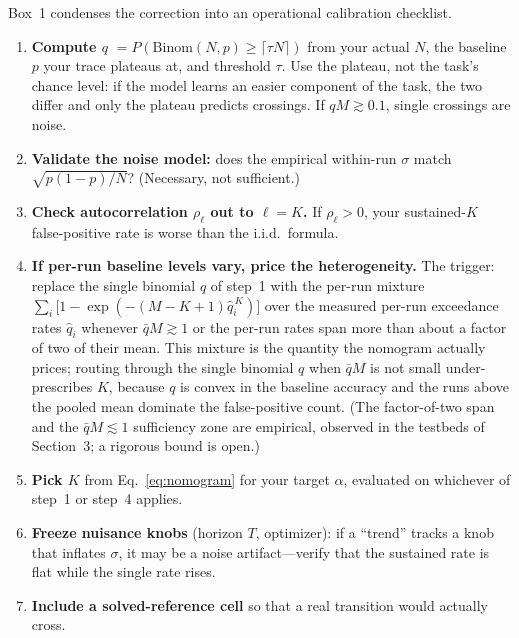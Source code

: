 \documentclass[11pt]{article}
\theoremstyle{plain}
\theoremstyle{definition}
\begin{document}
Box~1 condenses the correction into an operational calibration checklist.

\begin{tcolorbox}[colback=gray!6, colframe=gray!40, arc=2pt,
  left=6pt, right=6pt, top=4pt, bottom=4pt,
  title={\small\bfseries Box 1. Calibration checklist: before declaring emergence from a threshold crossing},
  fonttitle=\small\bfseries, breakable, enhanced]
\begin{enumerate}
\item \textbf{Compute $q$} $=P(\mathrm{Binom}(N,p)\geq\lceil\tau N\rceil)$ from your actual
  $N$, the baseline $p$ your trace plateaus at, and threshold $\tau$. Use the plateau, not
  the task's chance level: if the model learns an easier component of the task, the two
  differ and only the plateau predicts crossings. If $qM\gtrsim0.1$, single crossings are
  noise.
\item \textbf{Validate the noise model:} does the empirical within-run $\sigma$ match
  $\sqrt{p(1-p)/N}$? (Necessary, not sufficient.)
\item \textbf{Check autocorrelation $\rho_\ell$ out to $\ell=K$.} If $\rho_\ell>0$, your
  sustained-$K$ false-positive rate is worse than the i.i.d.\ formula.
\item \textbf{If per-run baseline levels vary, price the heterogeneity.} The trigger:
  replace the single binomial $q$ of step~1 with the per-run mixture
  $\sum_i\bigl[1-\exp(-(M-K+1)\hat q_i^{\,K})\bigr]$ over the measured per-run exceedance
  rates $\hat q_i$ whenever $\bar qM \gtrsim 1$ or the per-run rates span more than
  about a factor of two of their mean. This mixture is the quantity the nomogram
  actually prices; routing through the single binomial $q$ when $\bar qM$ is not
  small under-prescribes $K$, because $q$ is convex in the baseline accuracy and the
  runs above the pooled mean dominate the false-positive count. (The factor-of-two
  span and the $\bar qM \lesssim 1$ sufficiency zone are empirical, observed in the
  testbeds of Section~3; a rigorous bound is open.)
\item \textbf{Pick $K$} from Eq.~\eqref{eq:nomogram} for your target $\alpha$, evaluated on
  whichever of step~1 or step~4 applies.
\item \textbf{Freeze nuisance knobs} (horizon $T$, optimizer): if a ``trend'' tracks a knob
  that inflates $\sigma$, it may be a noise artifact---verify that the sustained rate is
  flat while the single rate rises.
\item \textbf{Include a solved-reference cell} so that a real transition would actually
  cross.
\end{enumerate}
\end{tcolorbox}
\end{document}
